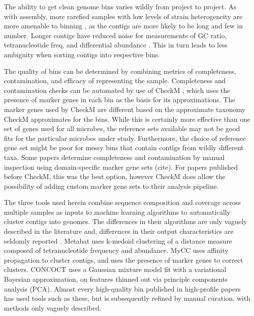The ability to get clean genome bins varies wildly from project to project.
As with assembly, more rarefied samples with low levels of strain heterogeneity are more amenable to binning \cite{kunin2008, thomas2012}, as the contigs are more likely to be long and few in number.
Longer contigs have reduced noise for measurements of GC ratio, tetranucleotide freq, and differential abundance \cite{sangwan2016}.
This in turn leads to less ambiguity when sorting contigs into respective bins.

The quality of bins can be determined by combining metrics of completeness, contamination, and efficacy of representing the sample.
Completeness and contamination checks can be automated by use of CheckM \cite{parks2015}, which uses the presence of marker genes in each bin as the basis for its approximations.
The marker genes used by CheckM are different based on the approximate taxonomy CheckM approximates for the bins.
While this is certainly more effective than one set of genes used for all microbes, the reference sets available may not be good fits for the particular microbes under study.
Furthermore, the choice of reference gene set might be poor for messy bins that  contain contigs from wildly different taxa.
Some papers determine completeness and contamination by manual inspection using domain-specific marker gene sets (cite).
For papers published before CheckM, this was the best option, however CheckM does allow the possibility of adding custom marker gene sets to their analysis pipeline.

The three tools used herein combine sequence composition and coverage across multiple samples as inputs to machine learning algorithms to automatically cluster contigs into genomes.
The differences in their algorithms are only vaguely described in the literature and, differences in their output characteristics are seldomly reported \cite{sangwan2016}.
Metabat \cite{metabat2015} uses k-medoid clustering of a distance measure composed of tetranucleotide frequency and abundance.
MyCC \cite{mycc2016} uses affinity propagation to cluster contigs, and uses the presence of marker genes to correct clusters.
CONCOCT \cite{concoct2014} uses a Gaussian mixture model fit with a variational Bayesian approximation, on features thinned out via principle components analysis (PCA).
Almost every high-quality bin published in high-profile papers has used tools such as these, but is subsequently refined by manual curation, with methods only vaguely described.

